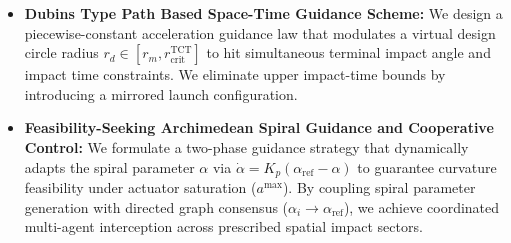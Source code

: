 \documentclass[openright,twoside]{iitbthesis}
\begin{document}
\begin{itemize}
\begin{itemize}
            \item For two loops/cycles, partial overlap between cycles ($s > 0$) strictly improves $\mathcal{H}_2$ performance, compared to non-overlapping loop configurations.
        \end{itemize}
    \item \textbf{Dubins Type Path Based Space-Time Guidance Scheme:} We design a piecewise-constant acceleration guidance law that modulates a virtual design circle radius $r_d \in [r_m, r_{\text{crit}}^{\text{TCT}}]$ to hit simultaneous terminal impact angle and impact time constraints. We eliminate upper impact-time bounds by introducing a mirrored launch configuration. 
    \item \textbf{Feasibility-Seeking Archimedean Spiral Guidance and Cooperative Control:} We formulate a two-phase guidance strategy that dynamically adapts the spiral parameter $\alpha$ via $\dot{\alpha} = K_p(\alpha_{\text{ref}} - \alpha)$ to guarantee curvature feasibility under actuator saturation ($a^{\text{max}}$). By coupling spiral parameter generation with directed graph consensus ($\alpha_i \to \alpha_{\text{ref}}$), we achieve coordinated multi-agent interception across prescribed spatial impact sectors.
\end{itemize}
\end{document}
